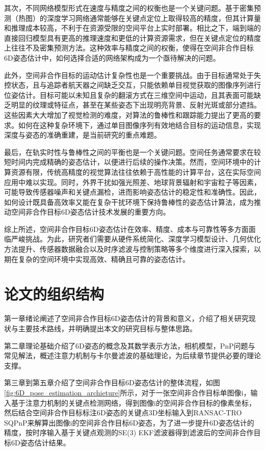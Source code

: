 其次，不同网络模型形式在速度与精度之间的权衡也是一个关键问题。基于密集预测（热图）的深度学习网络通常能够在关键点定位上取得较高的精度，但其计算量和推理成本较高，不利于在资源受限的空间平台上实时部署。相比之下，端到端的直接回归模型具有更高的推理速度和更低的计算资源需求，但在关键点定位的精度上往往不及密集预测方法。这种效率与精度之间的权衡，使得在空间非合作目标6D姿态估计中，如何选择合适的网络架构成为一个亟待解决的问题。

此外，空间非合作目标的运动估计复杂性也是一个重要挑战。由于目标通常处于失控状态，且与追踪者航天器之间缺乏交互，只能依赖单目视觉获取的图像序列进行位姿估计。目标可能以未知且复杂的翻滚方式在三维空间中运动，且其表面可能缺乏明显的纹理或特征点，甚至在某些姿态下出现明亮背景、反射光斑或部分遮挡。这些因素大大增加了视觉检测的难度，对算法的鲁棒性和跟踪能力提出了更高的要求。如何在这种复杂环境下，通过单目图像序列有效地结合目标的运动信息，实现深度与姿态的准确重建，是当前研究的重点难题。

最后，在轨实时性与鲁棒性之间的平衡也是一个关键问题。空间任务通常要求在较短时间内完成精确的姿态估计，以便进行后续的操作决策。然而，空间环境中的计算资源有限，传统高精度的视觉算法往往依赖于高性能的计算平台，这在实际空间应用中难以实现。同时，外界干扰如强光照差、地球背景辐射和宇宙粒子等因素，可能导致传感器噪声和关键点漏检，进而影响姿态估计的稳定性和准确性。因此，如何设计既具备高效率又能在复杂干扰环境下保持鲁棒性的姿态估计算法，成为推动空间非合作目标6D姿态估计技术发展的重要方向。

综上所述，空间非合作目标6D姿态估计在效率、精度、成本与可靠性等多方面面临严峻挑战。为此，研究者们需要从硬件系统简化、深度学习模型设计、几何优化方法提升、传感器数据融合以及时序滤波与控制策略等多个维度进行深入探索，以期在复杂的空间环境中实现高效、精确且可靠的姿态估计。
\section{论文的组织结构}
第一章绪论阐述了空间非合作目标6D姿态估计的背景和意义，介绍了相关研究现状与主要技术路线，并明确提出本文的研究目标与整体思路。

第二章理论基础介绍了6D姿态的概念及其数学表示方法，相机模型，PnP问题与常见解法，概述注意力机制与卡尔曼滤波的基础理论，为后续章节提供必要的理论支撑。

第三章到第五章介绍了空间非合作目标6D姿态估计的整体流程，如图\ref{fig:6D_pose_estimation_archieture}所示，对于一张空间非合作目标单图像i，输入基于注意力机制的关键点检测网络，得到图像i的空间非合作目标的像素坐标，然后结合空间非合作目标标注6D姿态的关键点3D坐标输入到RANSAC-TRO SQPnP来解算出图像i的空间非合作目标6D姿态，为了进一步提升6D姿态估计的精度，按时序输入基于关键点观测的SE(3) EKF滤波器得到滤波后的空间非合作目标6D姿态估计结果。

